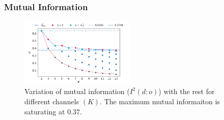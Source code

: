 \documentclass[reprint,prb,superscriptaddress]{revtex4-1}
\begin{document}
\subsubsection{Mutual Information}

\begin{figure}[!htpb]
\includegraphics[width=0.49\textwidth]{plt/NEW31Dec_I_2_vs_Nch_[0,1]}
\caption{Variation of mutual information ($I^2(d:o)$) with the rest for different channels $(K)$. The maximum mutual informaiton is saturating at $0.37$.}
\label{fig:MI_d_o}
\end{figure}
\end{document}
